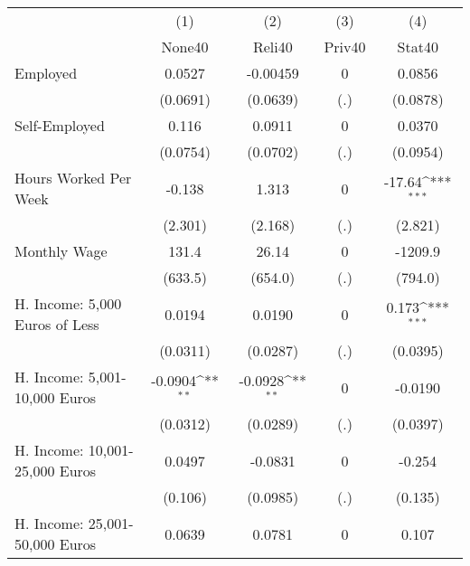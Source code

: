 {
\def\sym#1{\ifmmode^{#1}\else\(^{#1}\)\fi}
\begin{tabular}{l*{4}{c}}
\hline\hline
            &\multicolumn{1}{c}{(1)}&\multicolumn{1}{c}{(2)}&\multicolumn{1}{c}{(3)}&\multicolumn{1}{c}{(4)}\\
            &\multicolumn{1}{c}{None40}&\multicolumn{1}{c}{Reli40}&\multicolumn{1}{c}{Priv40}&\multicolumn{1}{c}{Stat40}\\
\hline
Employed    &      0.0527         &    -0.00459         &           0         &      0.0856         \\
            &    (0.0691)         &    (0.0639)         &         (.)         &    (0.0878)         \\
[1em]
Self-Employed&       0.116         &      0.0911         &           0         &      0.0370         \\
            &    (0.0754)         &    (0.0702)         &         (.)         &    (0.0954)         \\
[1em]
Hours Worked Per Week&      -0.138         &       1.313         &           0         &      -17.64\sym{***}\\
            &     (2.301)         &     (2.168)         &         (.)         &     (2.821)         \\
[1em]
Monthly Wage&       131.4         &       26.14         &           0         &     -1209.9         \\
            &     (633.5)         &     (654.0)         &         (.)         &     (794.0)         \\
[1em]
H. Income: 5,000 Euros of Less&      0.0194         &      0.0190         &           0         &       0.173\sym{***}\\
            &    (0.0311)         &    (0.0287)         &         (.)         &    (0.0395)         \\
[1em]
H. Income: 5,001-10,000 Euros&     -0.0904\sym{**} &     -0.0928\sym{**} &           0         &     -0.0190         \\
            &    (0.0312)         &    (0.0289)         &         (.)         &    (0.0397)         \\
[1em]
H. Income: 10,001-25,000 Euros&      0.0497         &     -0.0831         &           0         &      -0.254         \\
            &     (0.106)         &    (0.0985)         &         (.)         &     (0.135)         \\
[1em]
H. Income: 25,001-50,000 Euros&      0.0639         &      0.0781         &           0         &       0.107         \\

\end{tabular}}
